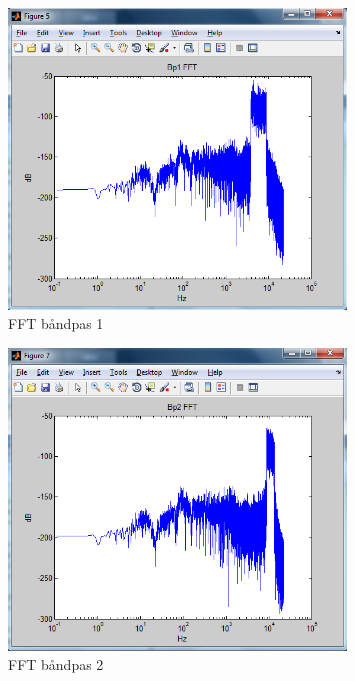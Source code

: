 \begin{figure}[h]
	\centering
	\includegraphics[width=0.8\textwidth]{Figurer/4_Bp1_FFT}
	\caption{FFT båndpas 1}
	\label{Figur 7}
\end{figure}

\begin{figure}[h]
	\centering
	\includegraphics[width=0.8\textwidth]{Figurer/5_Bp2_FFT}
	\caption{FFT båndpas 2}
	\label{Figur 8}
\end{figure}

